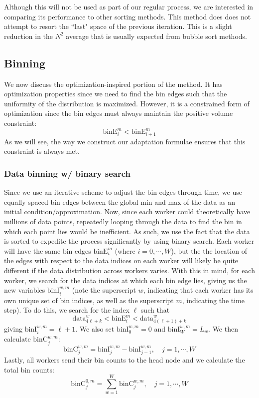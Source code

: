 \documentclass{article}
\begin{document}
Although this will not be used as part of our regular process, we are interested in comparing its performance to other sorting methods. This method does does not attempt to resort the ``last" space of the previous iteration. This is a slight reduction in the $N^2$ average that is usually expected from bubble sort methods. 

\subsection{Binning}
We now discuss the optimization-inspired portion of the method. It has optimization properties since we need to find the bin edges such that the uniformity of the distribution is maximized. However, it is a constrained form of optimization since the bin edges must always maintain the positive volume constraint:
\begin{equation}
	\textrm{binE}^m_i < \textrm{binE}^m_{i+1}
\end{equation}
As we will see, the way we construct our adaptation formulae ensures that this constraint is always met.

\subsubsection{Data binning w/ binary search}
Since we use an iterative scheme to adjust the bin edges through time, we use equally-spaced bin edges between the global min and max of the data as an initial condition/approximation. Now, since each worker could theoretically have millions of data points, repeatedly looping through the data to find the bin in which each point lies would be inefficient. As such, we use the fact that the data is sorted to expedite the process significantly by using binary search. Each worker will have the same bin edges $\textrm{binE}^m_i$ (where $i = 0, \cdots, W$), but the the location of the edges with respect to the data indices on each worker will likely be quite different if the data distribution across workers varies. With this in mind, for each worker, we search for the data indices at which each bin edge lies, giving us the new variables $\textrm{binI}^{w,m}_i$ (note the superscript $w$, indicating that each worker has its own unique set of bin indices, as well as the superscript $m$, indicating the time step). To do this, we search for the index $\ell$ such that
\begin{equation}
	\textrm{data}^w_{4\ell+k} < \textrm{binE}^m_i < \textrm{data}^w_{{4(\ell+1)+k}}
\end{equation}
giving $\textrm{binI}^{w,m}_i = \ell+1$. We also set $\textrm{binI}^{w,m}_0 = 0$ and $\textrm{binI}^{w,m}_W = L_w$. We then calculate $\textrm{binC}^{w,m}_j$:
\begin{equation}
	\textrm{binC}^{w,m}_j = \textrm{binI}^{w,m}_j - \textrm{binI}^{w,m}_{j-1}, \quad j = 1, \cdots, W
\end{equation}
Lastly, all workers send their bin counts to the head node and we calculate the total bin counts:
\begin{equation}
	\textrm{binC}^{0,m}_j = \sum_{w=1}^{W} \textrm{binC}^{w,m}_j, \quad j = 1, \cdots, W
\end{equation}
\end{document}
